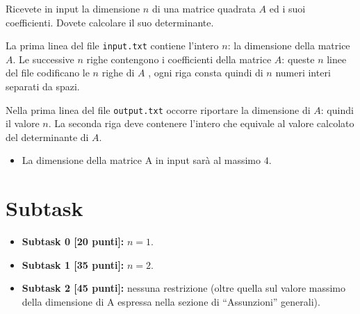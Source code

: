 \renewcommand{\nomebreve}{determinante\_matrice}
\renewcommand{\titolo}{Calcolo Determinante Matrici}

\introduzione{}

Ricevete in input la dimensione $n$ di una matrice quadrata $A$ ed i suoi coefficienti.
Dovete calcolare il suo determinante.

La prima linea del file \verb'input.txt' contiene l'intero $n$: la dimensione della matrice $A$.
Le successive $n$ righe contengono i coefficienti della matrice $A$: queste $n$ linee del file codificano le $n$ righe di $A$ , ogni riga consta quindi di $n$ numeri interi separati da spazi. 
 
Nella prima linea del file \verb'output.txt' occorre riportare la dimensione di $A$: quindi il valore $n$.
La seconda riga deve contenere l'intero che equivale al valore calcolato del determinante di $A$.
   



\begin{itemize}[nolistsep, noitemsep]
  \item La dimensione della matrice A in input sarà al massimo $4$.
\end{itemize}
  
  \section*{Subtask}
  \begin{itemize}    
    \item \textbf{Subtask 0 [20 punti]:} $n=1$.
    \item \textbf{Subtask 1 [35 punti]:} $n=2$.
    \item \textbf{Subtask 2 [45 punti]:} nessuna restrizione (oltre quella sul valore massimo della dimensione di A espressa nella sezione di ``Assunzioni'' generali).
  \end{itemize}

